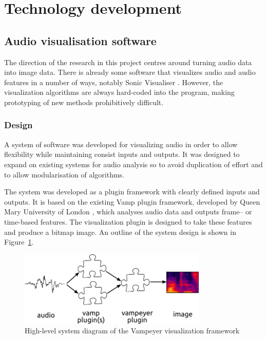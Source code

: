 \section{Technology development}\label{sec:tech}

\subsection{Audio visualisation software}\label{sec:vis}
The direction of the research in this project centres around turning audio
data into image data. There is already some software that visualizes audio and
audio features in a number of ways, notably Sonic Visualiser \cite{Cannam2010}.
However, the visualization algorithms are always hard-coded into the program,
making prototyping of new methods prohibitively difficult.

\subsubsection{Design}
A system of software was developed for visualizing audio in order to allow
flexibility while maintaining consist inputs and outputs. It was
designed to expand on existing systems for audio analysis so to avoid
duplication of effort and to allow modularisation of algorithms.

The system was developed as a plugin framework with clearly defined inputs and
outputs. It is based on the existing Vamp plugin framework, developed by Queen
Mary University of London \cite{Cannam2010}, which analyses audio data and
outputs frame-- or time-based features. The visualization plugin is designed to
take these features and produce a bitmap image. An outline of the system design
is shown in Figure~\ref{fig:vampeyer}.

\begin{figure}[ht]
  \centering
  \includegraphics[width=0.8\textwidth]{figs/vampeyer.png}
  \caption{High-level system diagram of the Vampeyer visualization framework}
  \label{fig:vampeyer}
\end{figure}

